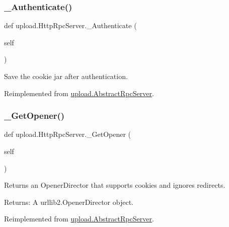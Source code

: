 \subsubsection{\texorpdfstring{\_Authenticate()}{\_Authenticate()}\hspace{0.1cm}{\footnotesize\ttfamily [2/2]}}
{\footnotesize\ttfamily def upload.\+Http\+Rpc\+Server.\+\_\+\+Authenticate (\begin{DoxyParamCaption}\item[{}]{self }\end{DoxyParamCaption})\hspace{0.3cm}{\ttfamily [private]}}

\begin{DoxyVerb}Save the cookie jar after authentication.\end{DoxyVerb}
 

Reimplemented from \mbox{\hyperlink{classupload_1_1_abstract_rpc_server_a8517a9d90ee2478752a53302f01d868d}{upload.\+Abstract\+Rpc\+Server}}.

\mbox{\label{classupload_1_1_http_rpc_server_a4685030df704ec17f020c8790108a05a}} 
\subsubsection{\texorpdfstring{\_GetOpener()}{\_GetOpener()}\hspace{0.1cm}{\footnotesize\ttfamily [1/2]}}
{\footnotesize\ttfamily def upload.\+Http\+Rpc\+Server.\+\_\+\+Get\+Opener (\begin{DoxyParamCaption}\item[{}]{self }\end{DoxyParamCaption})\hspace{0.3cm}{\ttfamily [private]}}

\begin{DoxyVerb}Returns an OpenerDirector that supports cookies and ignores redirects.

Returns:
  A urllib2.OpenerDirector object.
\end{DoxyVerb}
 

Reimplemented from \mbox{\hyperlink{classupload_1_1_abstract_rpc_server_a388a9974eab1157ba4785e2ab2c33be9}{upload.\+Abstract\+Rpc\+Server}}.

\mbox{\label{classupload_1_1_http_rpc_server_a4685030df704ec17f020c8790108a05a}} 
